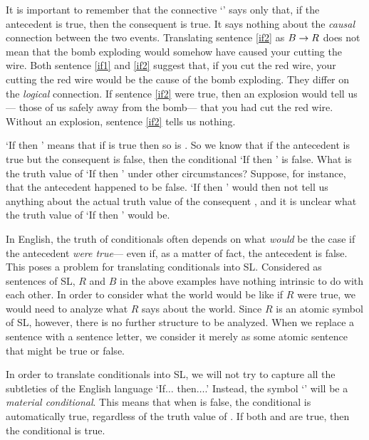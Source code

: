 It is important to remember that the connective `\eif' says only that, if the antecedent is true, then the consequent is true. It says nothing about the \emph{causal} connection between the two events. Translating sentence \ref{if2} as $B \rightarrow R$ does not mean that the bomb exploding would somehow have caused your cutting the wire. Both sentence \ref{if1} and \ref{if2} suggest that, if you cut the red wire, your cutting the red wire would be the cause of the bomb exploding. They differ on the \emph{logical} connection. If sentence \ref{if2} were true, then an explosion would tell us--- those of us safely away from the bomb--- that you had cut the red wire. Without an explosion, sentence \ref{if2} tells us nothing.



`If  then ' means that if  is true then so is . So we know that if the antecedent  is true but the consequent  is false, then the conditional `If  then ' is false. What is the truth value of `If  then ' under other circumstances? Suppose, for instance, that the antecedent  happened to be false. `If  then ' would then not tell us anything about the actual truth value of the consequent , and it is unclear what the truth value of `If  then ' would be.


In English, the truth of conditionals often depends on what \emph{would} be the case if the antecedent \emph{were true}--- even if, as a matter of fact, the antecedent is false. This poses a problem for translating conditionals into SL.  Considered as sentences of SL, $R$ and $B$ in the above examples have nothing intrinsic to do with each other. In order to consider what the world would be like if $R$ were true, we would need to analyze what $R$ says about the world. Since $R$ is an atomic symbol of SL, however, there is no further structure to be analyzed. When we replace a sentence with a sentence letter, we consider it merely as some atomic sentence that might be true or false.

In order to translate conditionals into SL, we will not try to capture all the subtleties of the English language `If$\ldots$ then$\ldots$.' Instead, the symbol `\eif' will be a \emph{material conditional}. This means that when  is false, the conditional \eif{} is automatically true, regardless of the truth value of . If both  and  are true, then the conditional \eif{} is true.


